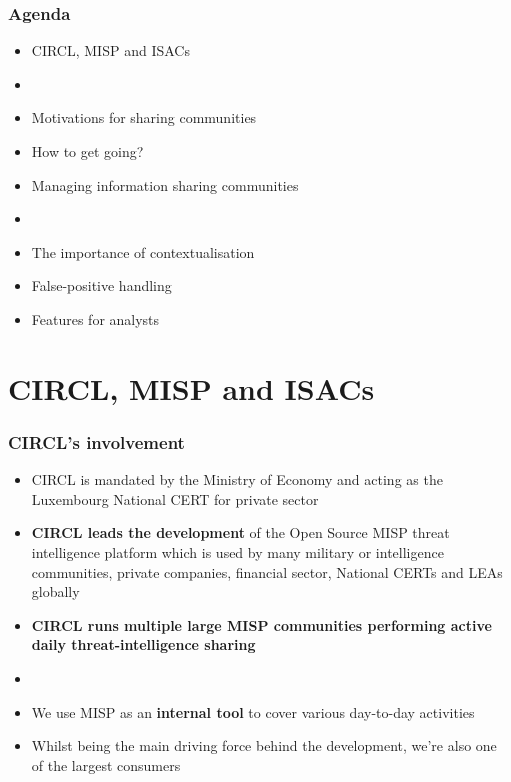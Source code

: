 
\begin{frame}[t,plain]
\titlepage
\end{frame}

\begin{frame}
	\frametitle{Agenda}
	\begin{itemize}
		\item CIRCL, MISP and ISACs
		\item []
		\item Motivations for sharing communities
		\item How to get going?
		\item Managing information sharing communities
		\item []
		\item The importance of contextualisation
		\item False-positive handling
		\item Features for analysts
	\end{itemize}
\end{frame}

\section{CIRCL, MISP and ISACs}

\begin{frame}
	\frametitle{CIRCL's involvement}
	\begin{itemize}
		\item CIRCL is mandated by the Ministry of Economy and acting as the Luxembourg National CERT for private sector
		\item \textbf{CIRCL leads the development} of the Open Source MISP threat intelligence platform which is used by many military or intelligence communities, private companies, financial sector, National CERTs and LEAs globally
		\item \textbf{CIRCL runs multiple large MISP communities performing active daily threat-intelligence sharing}
        \item []
        \item We use MISP as an \textbf{internal tool} to cover various day-to-day activities
        \item Whilst being the main driving force behind the development, we're also one of the largest consumers
	\end{itemize}
\end{frame}


